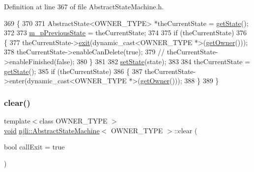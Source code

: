 Definition at line 367 of file Abstract\+State\+Machine.\+h.


\begin{DoxyCode}
369   \{
370 
371     AbstractState<OWNER\_TYPE> *theCurrentState = \mbox{\hyperlink{classnjli_1_1_abstract_state_machine_a026a33bc918f423304b442e0dfaa046e}{getState}}();
372 
373     \mbox{\hyperlink{classnjli_1_1_abstract_state_machine_a43a2c2c7a36aba24176e5d6d82ab9f45}{m\_pPreviousState}} = theCurrentState;
374 
375     \textcolor{keywordflow}{if} (theCurrentState)
376       \{
377         theCurrentState->\mbox{\hyperlink{classnjli_1_1_abstract_state_a75207a4c62f813d8d84168024a30c60a}{exit}}(dynamic\_cast<OWNER\_TYPE *>(\mbox{\hyperlink{classnjli_1_1_abstract_state_machine_aabf808253d72265695e03c299a434798}{getOwner}}()));
378         theCurrentState->enableCanDelete(\textcolor{keyword}{true});
379         \textcolor{comment}{//            theCurrentState->enableFinished(false);}
380       \}
381 
382     \mbox{\hyperlink{classnjli_1_1_abstract_state_machine_a6a399ba3abc4dbc2f5a0b6d23193c75e}{setState}}(state);
383 
384     theCurrentState = \mbox{\hyperlink{classnjli_1_1_abstract_state_machine_a026a33bc918f423304b442e0dfaa046e}{getState}}();
385     \textcolor{keywordflow}{if} (theCurrentState)
386       \{
387         theCurrentState->enter(dynamic\_cast<OWNER\_TYPE *>(\mbox{\hyperlink{classnjli_1_1_abstract_state_machine_aabf808253d72265695e03c299a434798}{getOwner}}()));
388       \}
389   \}
\end{DoxyCode}
\mbox{\label{classnjli_1_1_abstract_state_machine_a9b0f3cb1aed0c33381d85f204cde6f88}} 
\subsubsection{\texorpdfstring{clear()}{clear()}}
{\footnotesize\ttfamily template$<$class O\+W\+N\+E\+R\+\_\+\+T\+Y\+PE $>$ \\
\mbox{\hyperlink{_thread_8h_af1e856da2e658414cb2456cb6f7ebc66}{void}} \mbox{\hyperlink{classnjli_1_1_abstract_state_machine}{njli\+::\+Abstract\+State\+Machine}}$<$ O\+W\+N\+E\+R\+\_\+\+T\+Y\+PE $>$\+::clear (\begin{DoxyParamCaption}\item[{bool}]{call\+Exit = {\ttfamily true} }\end{DoxyParamCaption})}

